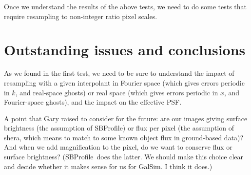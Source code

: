 \documentclass[preprint]{aastex}
\newcommand{\shera}{{\sc shera}}
\newcommand{\sbp}{SBProfile}
\begin{document}
Once we understand the results of the above tests, we need to do some tests that 
require resampling to non-integer ratio pixel scales.

\section{Outstanding issues and conclusions}

As we found in the first test, we need to be sure to understand the impact of
resampling with a given interpolant in Fourier space (which gives
errors periodic in $k$, and real-space ghosts) or real space (which
gives errors periodic in $x$, and Fourier-space ghosts), and the
impact on the effective PSF.

A point that Gary raised to consider for the future: are our images
giving surface brightness (the assumption of \sbp) or flux per pixel
(the assumption of \shera, which means to match to some known object
flux in ground-based data)?  And when we add magnification to the
pixel, do we want to conserve flux or surface brightness?  (\sbp\ does
the latter.  We should make this choice clear and decide whether it
makes sense for us for GalSim.  I think it does.)
\end{document}
